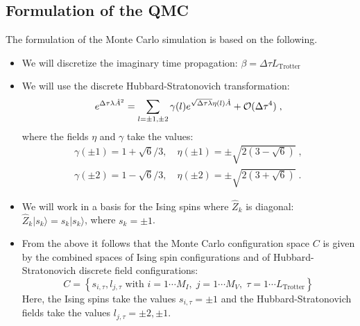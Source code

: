 \subsection{Formulation of the QMC}  
The formulation of the  Monte Carlo simulation is based on the following.
\begin{itemize}
\item  We will discretize the imaginary time propagation: $\beta = \Delta \tau L_{\text{Trotter}} $
\item  We will use  the   discrete Hubbard-Stratonovich transformation:
\begin{equation}
\label{HS_squares}
        e^{\Delta \tau  \lambda  \hat{A}^2 } =
        \sum_{ l = \pm 1, \pm 2}  \gamma(l)
e^{ \sqrt{\Delta \tau \lambda }
       \eta(l)  \hat{A} }
                + {\cal O} (\Delta \tau ^4)\;,
\end{equation}
where the fields $\eta$ and $\gamma$ take the values:
\begin{eqnarray}
 \gamma(\pm 1)  = 1 + \sqrt{6}/3, \quad  \eta(\pm 1 ) = \pm \sqrt{2 \left(3 - \sqrt{6} \right)}\;,\\\nonumber
  \gamma(\pm 2) = 1 - \sqrt{6}/3, \quad  \eta(\pm 2 ) = \pm \sqrt{2 \left(3 + \sqrt{6} \right)}\;.
\nonumber
\end{eqnarray}
\item  We will work in  a basis for the Ising spins  where  $\hat{Z}_k$ is diagonal: $\hat{Z}_{k}|s_{k}\rangle = s_{k}|s_{k}\rangle$, where $s_{k}=\pm 1$.
\item From the above it follows that the  Monte Carlo configuration space $C$  
is given by the combined spaces of Ising spin configurations  and of Hubbard-Stratonovich discrete field configurations:
\begin{equation}
	C = \left\{   s_{i,\tau} ,  l_{j,\tau}  \text{ with }  i=1\cdots M_I,\;  j = 1\cdots M_V,\; \tau=1\cdots L_{\mathrm{Trotter}}  \right\}
\end{equation}
Here, the Ising spins take the values  $s_{i,\tau} = \pm 1$ and  the Hubbard-Stratonovich fields take the values  $l_{j,\tau}  = \pm 2, \pm 1 $.
\end{itemize}

